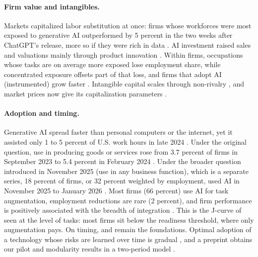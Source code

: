 \paragraph{Firm value and intangibles.} Markets capitalized labor substitution at once: firms whose workforces were most exposed to generative AI outperformed by 5 percent in the two weeks after ChatGPT's release, more so if they were rich in data \citep{eisfeldt2023generative}. AI investment raised sales and valuations mainly through product innovation \citep{babina2024artificial}. Within firms, occupations whose tasks are on average more exposed lose employment share, while concentrated exposure offsets part of that loss, and firms that adopt AI (instrumented) grow faster \citep{hampole2025artificial}. Intangible capital scales through non-rivalry \citep{crouzet2022economics,corrado2022intangible}, and market prices now give its capitalization parameters \citep{ewens2025measuring,eisfeldt2022intangible}.

\paragraph{Adoption and timing.} Generative AI spread faster than personal computers or the internet, yet it assisted only 1 to 5 percent of U.S. work hours in late 2024 \citep{bick2026rapid}. Under the original question, use in producing goods or services rose from 3.7 percent of firms in September 2023 to 5.4 percent in February 2024 \citep{bonney2024tracking}. Under the broader question introduced in November 2025 (use in any business function), which is a separate series, 18 percent of firms, or 32 percent weighted by employment, used AI in November 2025 to January 2026 \citep{bonney2026microstructure,allen2026monitoring,census2025btoswording}. Most firms (66 percent) use AI for task augmentation, employment reductions are rare (2 percent), and firm performance is positively associated with the breadth of integration \citep{bonney2026microstructure}. This is the J-curve of \citet{brynjolfsson2021productivity} seen at the level of tasks: most firms sit below the readiness threshold, where only augmentation pays. On timing, \citet{mcdonald1986value} and \citet{dixit1994investment} remain the foundations. Optimal adoption of a technology whose risks are learned over time is gradual \citep{acemoglu2024regulating}, and a preprint obtains our pilot and modularity results in a two-period model \citep{tewari2026pilot}.

